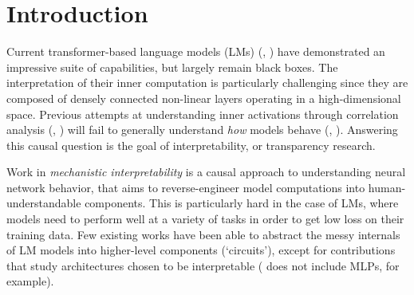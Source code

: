 \section{Introduction}
\label{sec:intro_new}



Current transformer-based language models (LMs) (\cite{Attention}, \cite{GPT3}) have demonstrated an impressive suite of capabilities, but largely remain black boxes. The interpretation of their inner computation is particularly challenging since they are composed of densely connected non-linear layers operating in a high-dimensional space. Previous attempts at understanding inner activations through correlation analysis (\cite{syntactic_Agreement_Mechanisms}, \cite{bert_nlp_pipeline}) will fail to generally understand \textit{how} models behave (\cite{antverg2021pitfalls}, \cite{attention_not_explanation}). Answering this causal question is the goal of interpretability, or transparency research.


Work in \textit{mechanistic interpretability} is a causal approach to understanding neural network behavior, that aims to reverse-engineer model computations into human-understandable components. This is particularly hard in the case of LMs, where models need to perform well at a variety of tasks in order to get low loss on their training data. Few existing works have been able to abstract the messy internals of LM models into higher-level components (`circuits'), except for contributions that study architectures chosen to be interpretable (\cite{elhage2021mathematical} does not include MLPs, for example). %

